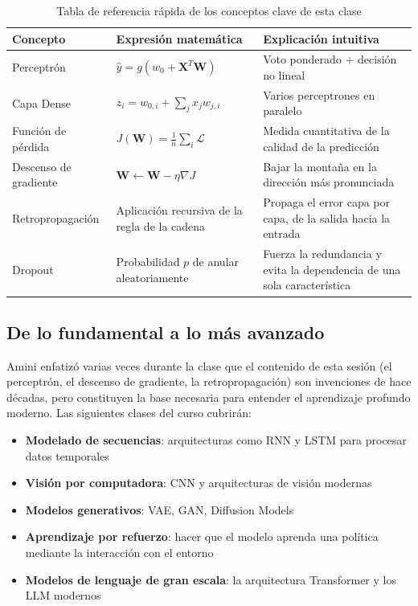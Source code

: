 \begin{table}[H]
\centering
\begin{tabular}{lp{5cm}p{5cm}}
\toprule
\textbf{Concepto} & \textbf{Expresión matemática} & \textbf{Explicación intuitiva} \\
\midrule
Perceptrón & $\hat{y} = g(w_0 + \mathbf{X}^T\mathbf{W})$ & Voto ponderado + decisión no lineal \\
Capa Dense & $z_i = w_{0,i} + \sum_j x_j w_{j,i}$ & Varios perceptrones en paralelo \\
Función de pérdida & $J(\mathbf{W}) = \frac{1}{n}\sum_i \mathcal{L}$ & Medida cuantitativa de la calidad de la predicción \\
Descenso de gradiente & $\mathbf{W} \leftarrow \mathbf{W} - \eta \nabla J$ & Bajar la montaña en la dirección más pronunciada \\
Retropropagación & Aplicación recursiva de la regla de la cadena & Propaga el error capa por capa, de la salida hacia la entrada \\
Dropout & Probabilidad $p$ de anular aleatoriamente & Fuerza la redundancia y evita la dependencia de una sola característica \\
\bottomrule
\end{tabular}
\caption{Tabla de referencia rápida de los conceptos clave de esta clase}
\end{table}

\subsection{De lo fundamental a lo más avanzado}

Amini enfatizó varias veces durante la clase que el contenido de esta sesión (el perceptrón, el descenso de gradiente, la retropropagación) son invenciones de hace décadas, pero constituyen la base necesaria para entender el aprendizaje profundo moderno. Las siguientes clases del curso cubrirán:

\begin{itemize}
\item \textbf{Modelado de secuencias}: arquitecturas como RNN y LSTM para procesar datos temporales
\item \textbf{Visión por computadora}: CNN y arquitecturas de visión modernas
\item \textbf{Modelos generativos}: VAE, GAN, Diffusion Models
\item \textbf{Aprendizaje por refuerzo}: hacer que el modelo aprenda una política mediante la interacción con el entorno
\item \textbf{Modelos de lenguaje de gran escala}: la arquitectura Transformer y los LLM modernos
\end{itemize}

